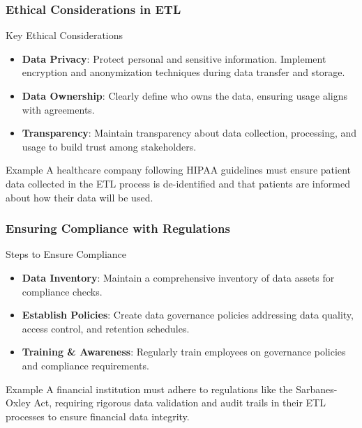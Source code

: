 \documentclass{beamer}
\begin{document}
\begin{frame}[fragile]
    \frametitle{Ethical Considerations in ETL}
    \begin{block}{Key Ethical Considerations}
        \begin{itemize}
            \item \textbf{Data Privacy}: Protect personal and sensitive information. Implement encryption and anonymization techniques during data transfer and storage.
            \item \textbf{Data Ownership}: Clearly define who owns the data, ensuring usage aligns with agreements.
            \item \textbf{Transparency}: Maintain transparency about data collection, processing, and usage to build trust among stakeholders.
        \end{itemize}
    \end{block}

    \begin{block}{Example}
        A healthcare company following HIPAA guidelines must ensure patient data collected in the ETL process is de-identified and that patients are informed about how their data will be used.
    \end{block}
\end{frame}

\begin{frame}[fragile]
    \frametitle{Ensuring Compliance with Regulations}
    \begin{block}{Steps to Ensure Compliance}
        \begin{itemize}
            \item \textbf{Data Inventory}: Maintain a comprehensive inventory of data assets for compliance checks.
            \item \textbf{Establish Policies}: Create data governance policies addressing data quality, access control, and retention schedules.
            \item \textbf{Training \& Awareness}: Regularly train employees on governance policies and compliance requirements.
        \end{itemize}
    \end{block}

    \begin{block}{Example}
        A financial institution must adhere to regulations like the Sarbanes-Oxley Act, requiring rigorous data validation and audit trails in their ETL processes to ensure financial data integrity.
    \end{block}
\end{frame}
\end{document}
